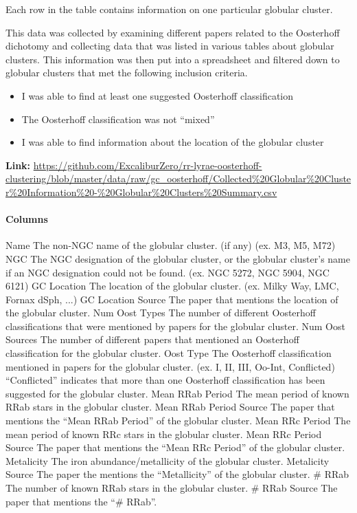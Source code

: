 \documentclass[]{article}
\begin{document}
Each row in the table contains information on one particular globular cluster.

\vspace{12pt}

This data was collected by examining different papers related to the Oosterhoff dichotomy and collecting data that was listed in various tables about globular clusters. This information was then put into a spreadsheet and filtered down to globular clusters that met the following inclusion criteria.

\begin{itemize}
	\item I was able to find at least one suggested Oosterhoff classification
	\item The Oosterhoff classification was not ``mixed''
	\item I was able to find information about the location of the globular cluster
\end{itemize}

\textbf{Link:} \url{https://github.com/ExcaliburZero/rr-lyrae-oosterhoff-clustering/blob/master/data/raw/gc_oosterhoff/Collected\%20Globular\%20Cluster\%20Information\%20-\%20Globular\%20Clusters\%20Summary.csv}

\paragraph{Columns}

\begin{outline}
	\1 Name
	\2 The non-NGC name of the globular cluster. (if any) (ex. M3, M5, M72)
	\1 NGC
	\2 The NGC designation of the globular cluster, or the globular cluster’s name if an NGC designation could not be found. (ex. NGC 5272, NGC 5904, NGC 6121)
	\1 GC Location
	\2 The location of the globular cluster. (ex. Milky Way, LMC, Fornax dSph, ...)
	\1 GC Location Source
	\2 The paper that mentions the location of the globular cluster.
	\1 Num Oost Types
	\2 The number of different Oosterhoff classifications that were mentioned by papers for the globular cluster.
	\1 Num Oost Sources
	\2 The number of different papers that mentioned an Oosterhoff classification for the globular cluster.
	\1 Oost Type
	\2 The Oosterhoff classification mentioned in papers for the globular cluster. (ex. I, II, III, Oo-Int, Conflicted)
	\2 ``Conflicted'' indicates that more than one Oosterhoff classification has been suggested for the globular cluster.
	\1 Mean RRab Period
	\2 The mean period of known RRab stars in the globular cluster.
	\1 Mean RRab Period Source
	\2 The paper that mentions the ``Mean RRab Period'' of the globular cluster.
	\1 Mean RRc Period
	\2 The mean period of known RRc stars in the globular cluster.
	\1 Mean RRc Period Source
	\2 The paper that mentions the ``Mean RRc Period'' of the globular cluster.
	\1 Metalicity
	\2 The iron abundance/metallicity of the globular cluster.
	\1 Metalicity Source
	\2 The paper the mentions the ``Metallicity'' of the globular cluster.
	\1 \# RRab
	\2 The number of known RRab stars in the globular cluster.
	\1 \# RRab Source
	\2 The paper that mentions the ``\# RRab''.
\end{outline}
\end{document}
